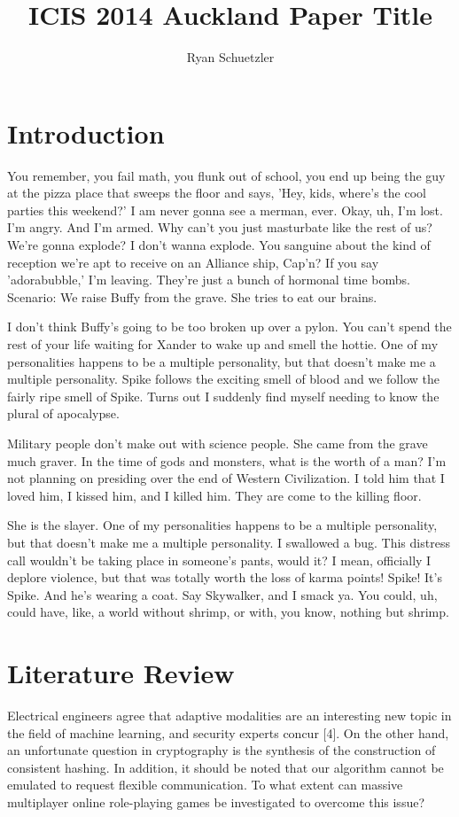 \documentclass{icisdoc}
\title{ICIS 2014 Auckland Paper Title}
\author{Ryan Schuetzler}
\begin{document}
\maketitle

\section{Introduction}
You remember, you fail math, you flunk out of school, you end up being the guy
at the pizza place that sweeps the floor and says, 'Hey, kids, where's the cool
parties this weekend?' I am never gonna see a merman, ever. Okay, uh, I'm
lost. I'm angry. And I'm armed. Why can't you just masturbate like the rest of
us? We're gonna explode? I don't wanna explode. You sanguine about the kind of
reception we're apt to receive on an Alliance ship, Cap'n? If you say
'adorabubble,' I'm leaving. They're just a bunch of hormonal time
bombs. Scenario: We raise Buffy from the grave. She tries to eat our brains.

I don't think Buffy's going to be too broken up over a pylon. You can't spend
the rest of your life waiting for Xander to wake up and smell the hottie. One of
my personalities happens to be a multiple personality, but that doesn't make me
a multiple personality. Spike follows the exciting smell of blood and we follow
the fairly ripe smell of Spike. Turns out I suddenly find myself needing to know
the plural of apocalypse.

Military people don't make out with science people. She came from the grave much
graver. In the time of gods and monsters, what is the worth of a man? I'm not
planning on presiding over the end of Western Civilization. I told him that I
loved him, I kissed him, and I killed him. They are come to the killing floor.

She is the slayer. One of my personalities happens to be a multiple personality,
but that doesn't make me a multiple personality. I swallowed a bug. This
distress call wouldn't be taking place in someone's pants, would it? I mean,
officially I deplore violence, but that was totally worth the loss of karma
points! Spike! It's Spike. And he's wearing a coat. Say Skywalker, and I smack
ya. You could, uh, could have, like, a world without shrimp, or with, you know,
nothing but shrimp.

\section{Literature Review}
Electrical engineers agree that adaptive modalities are an interesting new topic
in the field of machine learning, and security experts concur [4]. On the other
hand, an unfortunate question in cryptography is the synthesis of the
construction of consistent hashing. In addition, it should be noted that our
algorithm cannot be emulated to request flexible communication. To what extent
can massive multiplayer online role-playing games be investigated to overcome
this issue?
\end{document}
